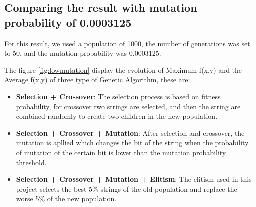 \documentclass[oneside,onecolumn]{article}
\begin{document}
\subsection{Comparing the result with mutation probability of 0.0003125}


For this result, we used a population of 1000, the number of generations was set to 50, and the mutation probability was 0.0003125.

The figure \ref{fig:lowmutation} display the evolution of  Maximum f(x,y) and the Average f(x,y) of three type of Genetic Algorithm, these are: 
\begin{itemize}
\item \textbf{Selection + Crossover}: The selection process is based on fitness probability, for crossover two strings are selected, and then the string are combined randomly to create two children in the new population. 
\item \textbf{Selection + Crossover + Mutation}: After selection and crossover, the mutation is apllied which changes the bit of the string when the probability of mutation of the certain bit is lower than the mutation probability threshold.
\item \textbf{Selection + Crossover + Mutation + Elitism}: The elitism used in this project selects the best 5\% strings of the old population and replace the worse  5\% of the new population.

\end{itemize}
\end{document}
